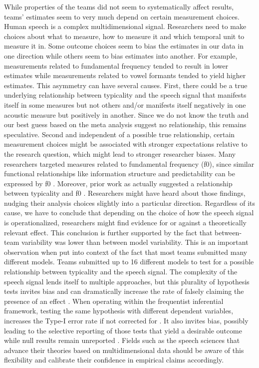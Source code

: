 \documentclass[Review,times,sageh]{sagej}
\begin{document}
While properties of the teams did not seem to systematically affect results, teams' estimates seem to very much depend on certain measurement choices.
Human speech is a complex multidimensional signal.
Researchers need to make choices about what to measure, how to measure it and which temporal unit to measure it in.
Some outcome choices seem to bias the estimates in our data in one direction while others seem to bias estimates into another.
For example, measurements related to fundamental frequency tended to result in lower estimates while measurements related to vowel formants tended to yield higher estimates.
This asymmetry can have several causes.
First, there could be a true underlying relationship between typicality and the speech signal that manifests itself in some measures but not others and/or manifests itself negatively in one acoustic measure but positively in another.
Since we do not know the truth and our best guess based on the meta analysis suggest no relationship, this remains speculative.
Second and independent of a possible true relationship, certain measurement choices might be associated with stronger expectations relative to the research question, which might lead to stronger researcher biases.
Many researchers targeted measures related to fundamental frequency (f0), since similar functional relationships like information structure and predictability can be expressed by f0 \citep[e.g.][]{grice2017integrating, turnbull2017role}.
Moreover, prior work as actually suggested a relationship between typicality and f0 \citep[e.g.][]{dimitrova2008prosodic, dimitrova2009did}.
Researchers might have heard about those findings, nudging their analysis choices slightly into a particular direction.
Regardless of its cause, we have to conclude that depending on the choice of how the speech signal is operationalized, researchers might find evidence for or against a theoretically relevant effect.
This conclusion is further supported by the fact that between-team variability was lower than between model variability.
This is an important observation when put into context of the fact that most teams submitted many different models.
Teams submitted up to 16 different models to test for a possible relationship between typicality and the speech signal.
The complexity of the speech signal lends itself to multiple approaches, but this plurality of hypothesis tests invites bias and can dramatically increase the rate of falsely claiming the presence of an effect \citep{roettger2019researcher}.
When operating within the frequentist inferential framework, testing the same hypothesis with different dependent variables, increases the Type-I error rate if not corrected for \citep{tukey1953}.
It also invites bias, possibly leading to the selective reporting of those tests that yield a desirable outcome \citep[\citet{john2012measuring}, \citet{simmons2011false}]{kerr1998harking} while null results remain unreported \citep[e.g.,][\citet{rosenthal1979file}]{sterling1959publication}.
Fields such as the speech sciences that advance their theories based on multidimensional data should be aware of this flexibility and calibrate their confidence in empirical claims accordingly.
\end{document}
